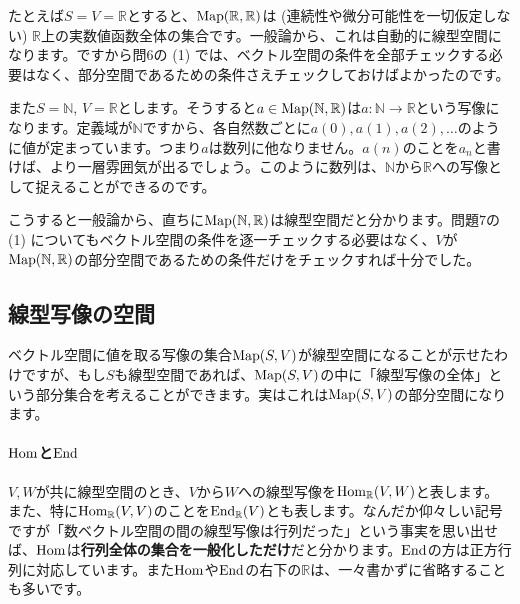 たとえば$S = V = \mathbb{R}$とすると、$\operatorname{Map}(\mathbb{R}, \mathbb{R})$は (連続性や微分可能性を一切仮定しない) $\mathbb{R}$上の実数値函数全体の集合です。一般論から、これは自動的に線型空間になります。ですから問6の (1) では、ベクトル空間の条件を全部チェックする必要はなく、部分空間であるための条件さえチェックしておけばよかったのです。

また$S = \mathbb{N}$, $V = \mathbb{R}$とします。そうすると$a \in \operatorname{Map}(\mathbb{N}, \mathbb{R})$は$a\colon \mathbb{N}\rightarrow\mathbb{R}$という写像になります。定義域が$\mathbb{N}$ですから、各自然数ごとに$a(0), a(1), a(2), \ldots$のように値が定まっています。つまり$a$は数列に他なりません。$a(n)$のことを$a_n$と書けば、より一層雰囲気が出るでしょう。このように数列は、$\mathbb{N}$から$\mathbb{R}$への写像として捉えることができるのです。

こうすると一般論から、直ちに$\operatorname{Map}(\mathbb{N}, \mathbb{R})$は線型空間だと分かります。問題$7$の (1) についてもベクトル空間の条件を逐一チェックする必要はなく、$V$が$\operatorname{Map}(\mathbb{N}, \mathbb{R})$の部分空間であるための条件だけをチェックすれば十分でした。

\subsection{線型写像の空間}

ベクトル空間に値を取る写像の集合$\operatorname{Map}(S, V)$が線型空間になることが示せたわけですが、もし$S$も線型空間であれば、$\operatorname{Map}(S, V)$の中に「線型写像の全体」という部分集合を考えることができます。実はこれは$\operatorname{Map}(S, V)$の部分空間になります。

\paragraph{$\operatorname{Hom}$と$\operatorname{End}$}

$V, W$が共に線型空間のとき、$V$から$W$への線型写像を$\operatorname{Hom}_{\mathbb{R}}(V, W)$と表します。また、特に$\operatorname{Hom}_{\mathbb{R}}(V, V)$のことを$\operatorname{End}_{\mathbb{R}}(V)$とも表します。なんだか仰々しい記号ですが「数ベクトル空間の間の線型写像は行列だった」という事実を思い出せば、$\operatorname{Hom}$は\textbf{行列全体の集合を一般化しただけ}だと分かります。$\operatorname{End}$の方は正方行列に対応しています。また$\operatorname{Hom}$や$\operatorname{End}$の右下の$\mathbb{R}$は、一々書かずに省略することも多いです。

